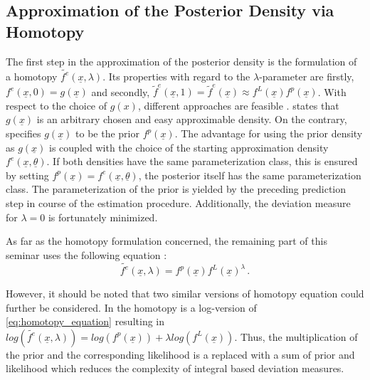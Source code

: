 \documentclass[a4paper]{IEEEtran}
\begin{document}
\subsection{Approximation of the Posterior Density via Homotopy}
\label{ch:approx_posterior_homotopy}
 The first step in the approximation of the posterior density is the formulation of a homotopy $\tilde{f^e}(\underline{x},\lambda)$. 
 Its properties with regard to the $\lambda$-parameter are firstly,  $f^e(\underline{x}, 0) = g(\underline{x})$ and secondly, $\tilde{f}^e(\underline{x}, 1) = \tilde{f}^{e}(\underline{x}) \approx  f^{L}(\underline{x}) f^{p}(\underline{x})$.
 With respect to the choice of $g(x)$, different approaches are feasible . \cite{hanebeck2003} states that $g(\underline{x})$ is an arbitrary chosen and easy approximable density. On the contrary, \cite{hagmar2011} specifies $g(\underline{x})$ to be the prior
 $f^p(\underline{x})$. The advantage for using the prior density as $g(\underline{x})$ is coupled with the choice of the starting approximation density $f^e(\underline{x}, \underline{\theta})$. If both densities have the same parameterization class, this is ensured by setting
 $f^p(\underline{x}) = f^e(\underline{x}, \underline{\theta})$, the posterior itself has the same parameterization class. The parameterization of the prior is yielded by the preceding prediction step in course of the estimation procedure.
Additionally, the deviation measure for $\lambda = 0$ is fortunately minimized.

 As far as the homotopy formulation concerned, the remaining part of this seminar uses the following equation \cite{hagmar2011}:
 \begin{equation}
    \tilde{f^e}(\underline{x},\lambda) = f^p(\underline{x})f^L(\underline{x})^{\lambda} \,.
    \label{eq:homotopy_equation}
 \end{equation}

However, it should be noted that two similar versions of homotopy equation could further be considered. In \cite{daum2007} the homotopy is a log-version of \eqref{eq:homotopy_equation}
resulting in $log(\tilde{f^e}(\underline{x},\lambda)) = log(f^p(\underline{x})) + \lambda log(f^L(\underline{x}))$. Thus, the multiplication of the prior and the corresponding likelihood is a replaced with a sum of prior and likelihood which reduces the 
complexity of integral based deviation measures.
\end{document}
